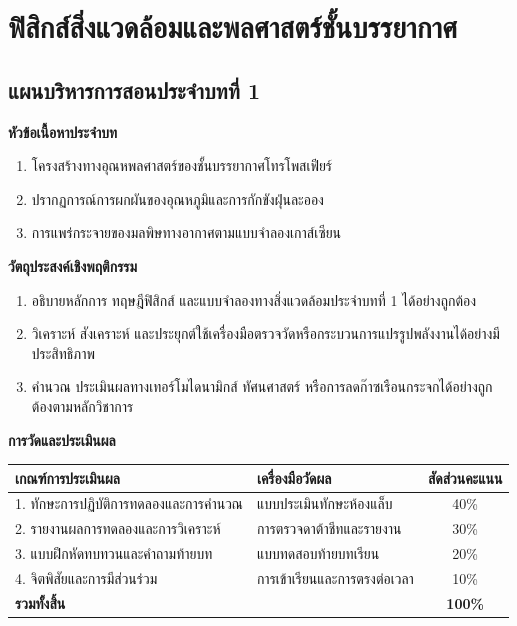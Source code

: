 \chapter{ฟิสิกส์สิ่งแวดล้อมและพลศาสตร์ชั้นบรรยากาศ}
\label{chap:ch01}

\section*{แผนบริหารการสอนประจำบทที่ 1}

\noindent\textbf{หัวข้อเนื้อหาประจำบท}
\begin{enumerate}
    \item โครงสร้างทางอุณหพลศาสตร์ของชั้นบรรยากาศโทรโพสเฟียร์
    \item ปรากฏการณ์การผกผันของอุณหภูมิและการกักขังฝุ่นละออง
    \item การแพร่กระจายของมลพิษทางอากาศตามแบบจำลองเกาส์เซียน
\end{enumerate}

\noindent\textbf{วัตถุประสงค์เชิงพฤติกรรม}
\begin{enumerate}
    \item อธิบายหลักการ ทฤษฎีฟิสิกส์ และแบบจำลองทางสิ่งแวดล้อมประจำบทที่ 1 ได้อย่างถูกต้อง
    \item วิเคราะห์ สังเคราะห์ และประยุกต์ใช้เครื่องมือตรวจวัดหรือกระบวนการแปรรูปพลังงานได้อย่างมีประสิทธิภาพ
    \item คำนวณ ประเมินผลทางเทอร์โมไดนามิกส์ ทัศนศาสตร์ หรือการลดก๊าซเรือนกระจกได้อย่างถูกต้องตามหลักวิชาการ
\end{enumerate}

\noindent\textbf{การวัดและประเมินผล}
\begin{table}[H]
\centering\small
\begin{tabularx}{\textwidth}{p{} p{} c}
\toprule
\textbf{เกณฑ์การประเมินผล} & \textbf{เครื่องมือวัดผล} & \textbf{สัดส่วนคะแนน} \\
\midrule
1. ทักษะการปฏิบัติการทดลองและการคำนวณ & แบบประเมินทักษะห้องแล็บ & 40\% \\
2. รายงานผลการทดลองและการวิเคราะห์ & การตรวจดาต้าชีทและรายงาน & 30\% \\
3. แบบฝึกหัดทบทวนและคำถามท้ายบท & แบบทดสอบท้ายบทเรียน & 20\% \\
4. จิตพิสัยและการมีส่วนร่วม & การเข้าเรียนและการตรงต่อเวลา & 10\% \\
\midrule
\textbf{รวมทั้งสิ้น} & & \textbf{100\%} \\
\bottomrule
\end{tabularx}
\end{table}
\newpage

